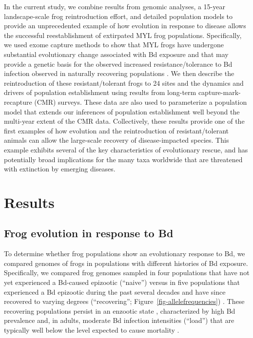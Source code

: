\documentclass[9pt,twocolumn,twoside,lineno]{pnas-new}
\begin{document}
In the current study, we combine results from genomic analyses, a
15-year landscape-scale frog reintroduction effort, and detailed
population models to provide an unprecedented example of how evolution
in response to disease allows the successful reestablishment of
extirpated MYL frog populations. Specifically, we used exome capture
methods to show that MYL frogs have undergone substantial evolutionary
change associated with Bd exposure and that may provide a genetic basis
for the observed increased resistance/tolerance to Bd infection observed
in naturally recovering populations \citep{knapp2016}. We then describe
the reintroduction of these resistant/tolerant frogs to 24 sites and the
dynamics and drivers of population establishment using results from
long-term capture-mark-recapture (CMR) surveys. These data are also used
to parameterize a population model that extends our inferences of
population establishment well beyond the multi-year extent of the CMR
data. Collectively, these results provide one of the first examples of
how evolution and the reintroduction of resistant/tolerant animals can
allow the large-scale recovery of disease-impacted species. This example
exhibits several of the key characteristics of evolutionary rescue, and
has potentially broad implications for the many taxa worldwide that are
threatened with extinction by emerging diseases.

\section*{Results}

\subsection*{Frog evolution in response to Bd}

To determine whether frog populations show an evolutionary response to
Bd, we compared genomes of frogs in populations with different histories
of Bd exposure. Specifically, we compared frog genomes sampled in four
populations that have not yet experienced a Bd-caused epizootic
(``naive'') \citep{zhou2015} versus in five populations that experienced
a Bd epizootic during the past several decades and have since recovered
to varying degrees (``recovering''; Figure~\ref{fig-allelefrequencies})
\citep{knapp2016, vredenburg2010}. These recovering populations persist
in an enzootic state \citep{briggs2010}, characterized by high Bd
prevalence and, in adults, moderate Bd infection intensities (``load'')
that are typically well below the level expected to cause mortality
\citep{vredenburg2010}.
\end{document}
